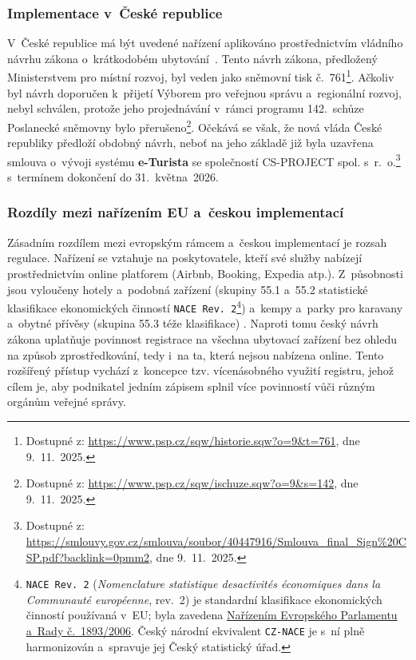 \subsubsection*{Implementace v~České republice}
\label{sec:e-turista}
V~České republice má být uvedené nařízení aplikováno prostřednictvím vládního návrhu zákona o~krátkodobém ubytování~\cite{cz-gov-turism}.
Tento návrh zákona, předložený Ministerstvem pro místní rozvoj, byl veden jako sněmovní tisk č.~761\footnote{Dostupné z: \url{https://www.psp.cz/sqw/historie.sqw?o=9&t=761}, dne 9.~11.~2025.}.
Ačkoliv byl návrh doporučen k~přijetí Výborem pro veřejnou správu a~regionální rozvoj, nebyl schválen, protože jeho projednávání v~rámci programu 142.~schůze Poslanecké sněmovny bylo přerušeno\footnote{Dostupné z: \url{https://www.psp.cz/sqw/ischuze.sqw?o=9&s=142}, dne 9.~11.~2025.}.
Očekává se však, že nová vláda České republiky předloží obdobný návrh, neboť na jeho základě již byla uzavřena smlouva o~vývoji systému \textbf{e-Turista} se společností CS-PROJECT spol. s~r.~o.\footnote{Dostupné z: \url{https://smlouvy.gov.cz/smlouva/soubor/40447916/Smlouva_final_Sign\%20CSP.pdf?backlink=0pmm2}, dne 9.~11.~2025.} s~termínem dokončení do 31.~května~2026.

\subsubsection*{Rozdíly mezi nařízením EU a~českou implementací}
Zásadním rozdílem mezi evropským rámcem a~českou implementací je rozsah regulace.
Nařízení se vztahuje na poskytovatele, kteří své služby nabízejí prostřednictvím online platforem (Airbnb, Booking, Expedia atp.).
Z~působnosti jsou vyloučeny hotely a~podobná zařízení (skupiny 55.1 a~55.2 statistické klasifikace ekonomických činností \texttt{NACE Rev.~2}\footnote{\texttt{NACE Rev.~2} (\textit{Nomenclature statistique desactivités économiques dans la Communauté européenne}, rev.~2) je standardní klasifikace ekonomických činností používaná v~EU; byla zavedena \href{https://eur-lex.europa.eu/legal-content/CS/ALL/?uri=CELEX:02006R1893-20250101}{Nařízením Evropského Parlamentu a~Rady č.~1893/2006}. Český národní ekvivalent \texttt{CZ-NACE} je s~ní plně harmonizován a~spravuje jej Český statistický úřad.}) a~kempy a~parky pro karavany a~obytné přívěsy
(skupina 55.3 téže klasifikace) \cite[čl.~2 odst.~2 písm.~a) a~b)]{eu-2024-1028}.
Naproti tomu český návrh zákona uplatňuje povinnost registrace na všechna ubytovací zařízení bez ohledu na způsob zprostředkování, tedy i~na ta, která nejsou nabízena online.
Tento rozšířený přístup vychází z~koncepce tzv. vícenásobného využití registru, jehož cílem je, aby podnikatel jedním zápisem splnil více povinností vůči různým orgánům veřejné správy.


